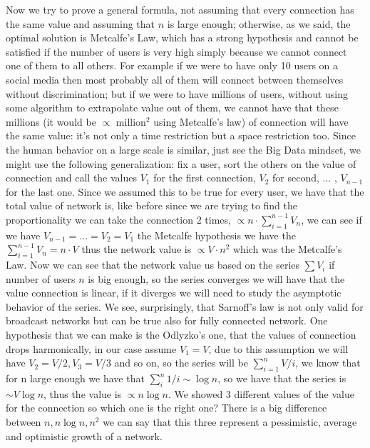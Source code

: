 \documentclass[12pt, a4page]{article}
\begin{document}
Now we try to prove a general formula, not %
assuming that every connection has the same value and assuming that $n$ is large enough; otherwise, as we said, %
the optimal solution is Metcalfe's Law, which has a strong hypothesis and cannot be satisfied if the number of users is very high simply because we cannot connect one of them to all others.
For example if we %
were to have only 10 users on a social media then most probably all of them will connect between themselves without discrimination; but if we were to have millions of users, without using some algorithm to extrapolate value out of them, we cannot have that these millions (it would be $\propto$ million$^2$ using Metcalfe's law) of connection will have the same value: it's not only a time restriction but a space restriction too. Since the human behavior on a large scale is similar, just see the Big Data mindset, we might use the following generalization:
fix a user, sort the others on the value of connection and call the values $V_1$ for the first connection, $V_2$ for second, ... , $V_{n-1}$ for the last one.
\newline
Since we assumed this to be true for every user, we have that the total value of network is, like before since we are trying to find the proportionality we can take the connection 2 times, $\propto n \cdot \sum_{i=1}^{n-1} V_n$, we can see if we have $V_{n-1}=...=V_2=V_1$ the Metcalfe hypothesis we have the $ \sum_{i=1}^{n-1} V_n = n\cdot V$ thus the network value is $\propto V \cdot n^2$ which was the Metcalfe's Law.
Now we can see that the network value us based on the series $\sum V_i$ if number of users $n$ is big enough, so the series converges we will have that the value connection is linear, if it diverges we will need to study the asymptotic behavior of the series.
We see, surprisingly, that Sarnoff's law is not only valid for broadcast networks but can be true also for fully connected network.\newline
One hypothesis that we can make is the Odlyzko's one, that the values of connection drops harmonically, in our case assume $V_1 = V$, due to this assumption we will have $V_2 = V/2, V_3 = V/3$ and so on, so the series will be $\sum_{i=1}^n V/i$, we know that for n large enough we have that $\sum_i^n 1/i \sim \log n$, so we have that the series is $\sim V \log n$, thus the value is $\propto n \log n$.\newline
We showed 3 different values of the value for the connection so which one is the right one? There is a big difference between $n, n\log n, n^2$ we can say that this three represent a pessimistic, average and optimistic growth of a network.
\end{document}
